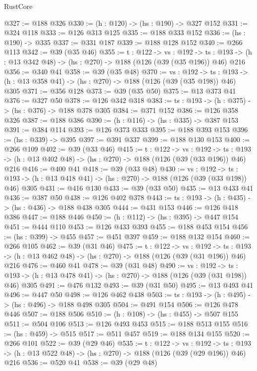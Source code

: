 \begin{lexlean}{RustCore}
\begin{coremodule}
@327 := @188 @326
@330 := (h : @120) -> (hs : @190) -> @327 @152
@331 := @324 @118
@333 := @126 @313 @125
@335 := @188 @333 @152
@336 := (hs : @190) -> @335
@337 := @331 @187
@339 := @188 @128 @152
@340 := @266 @113
@342 := @39 (@35 @46)
@355 := {t : @122} ->
  {vs : @192} ->
  {ts : @193} -> (h : @13 @342 @48) -> (hs : @270) -> @188 (@126 (@39 (@35 @196)) @46) @216
@356 := @340 @41
@358 := @39 (@35 @48)
@370 := {vs : @192} ->
  {ts : @193} -> (h : @13 @358 @41) -> (hs : @270) -> @188 (@126 (@39 (@35 @198)) @46) @305
@371 := @356 @128
@373 := @39 (@35 @50)
@375 := @13 @373 @41
@376 := @327 @50
@378 := @126 @342 @318
@383 := {ts : @193} -> (h : @375) -> (hs : @376) -> @188 @378 @305
@384 := @371 @152
@386 := @126 @358 @326
@387 := @188 @386
@390 := (h : @116) -> (hs : @335) -> @387 @153
@391 := @384 @114
@393 := @126 @373 @333
@395 := @188 @393 @153
@396 := (hs : @339) -> @395
@397 := @391 @337
@399 := @188 @130 @153
@400 := @266 @109
@402 := @39 (@33 @46)
@415 := {t : @122} ->
  {vs : @192} ->
  {ts : @193} -> (h : @13 @402 @48) -> (hs : @270) -> @188 (@126 (@39 (@33 @196)) @46) @216
@416 := @400 @41
@418 := @39 (@33 @48)
@430 := {vs : @192} ->
  {ts : @193} -> (h : @13 @418 @41) -> (hs : @270) -> @188 (@126 (@39 (@33 @198)) @46) @305
@431 := @416 @130
@433 := @39 (@33 @50)
@435 := @13 @433 @41
@436 := @387 @50
@438 := @126 @402 @378
@443 := {ts : @193} -> (h : @435) -> (hs : @436) -> @188 @438 @305
@444 := @431 @153
@446 := @126 @418 @386
@447 := @188 @446
@450 := (h : @112) -> (hs : @395) -> @447 @154
@451 := @444 @110
@453 := @126 @433 @393
@455 := @188 @453 @154
@456 := (hs : @399) -> @455
@457 := @451 @397
@459 := @188 @132 @154
@460 := @266 @105
@462 := @39 (@31 @46)
@475 := {t : @122} ->
  {vs : @192} ->
  {ts : @193} -> (h : @13 @462 @48) -> (hs : @270) -> @188 (@126 (@39 (@31 @196)) @46) @216
@476 := @460 @41
@478 := @39 (@31 @48)
@490 := {vs : @192} ->
  {ts : @193} -> (h : @13 @478 @41) -> (hs : @270) -> @188 (@126 (@39 (@31 @198)) @46) @305
@491 := @476 @132
@493 := @39 (@31 @50)
@495 := @13 @493 @41
@496 := @447 @50
@498 := @126 @462 @438
@503 := {ts : @193} -> (h : @495) -> (hs : @496) -> @188 @498 @305
@504 := @491 @154
@506 := @126 @478 @446
@507 := @188 @506
@510 := (h : @108) -> (hs : @455) -> @507 @155
@511 := @504 @106
@513 := @126 @493 @453
@515 := @188 @513 @155
@516 := (hs : @459) -> @515
@517 := @511 @457
@519 := @188 @134 @155
@520 := @266 @101
@522 := @39 (@29 @46)
@535 := {t : @122} ->
  {vs : @192} ->
  {ts : @193} -> (h : @13 @522 @48) -> (hs : @270) -> @188 (@126 (@39 (@29 @196)) @46) @216
@536 := @520 @41
@538 := @39 (@29 @48)

\end{coremodule}
\end{lexlean}
